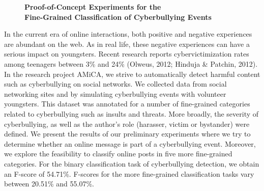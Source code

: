 \documentclass[10pt, a4paper, twopage, headinclude, footinclude, BCOR5mm]{scrartcl}
\begin{document}
\newpage

\begin{figure}[t!]
\centering
\large\textbf{Proof-of-Concept Experiments for the \\ Fine-Grained Classification of Cyberbullying Events}
\vspace*{0.5cm}
\end{figure}


        \begin{table}[t!]
    \end{table}

\noindent
In the current era of online interactions, both positive and negative experiences are abundant on the web. As in real life, these negative experiences can have a serious impact on youngsters. Recent research reports cybervictimization rates among teenagers between 3\% and 24\% (Olweus, 2012; Hinduja \& Patchin, 2012). In the research project AMiCA, we strive to automatically detect harmful content such as cyberbullying on social networks. We collected data from social networking sites and by simulating cyberbullying events with volunteer youngsters. This dataset was annotated for a number of fine-grained categories related to cyberbullying such as insults and threats. More broadly, the severity of cyberbullying, as well as the author's role (harasser, victim or bystander) were defined. We present the results of our preliminary experiments where we try to determine whether an online message is part of a cyberbullying event. Moreover, we explore the feasibility to classify online posts in five more fine-grained categories. For the binary classification task of cyberbullying detection, we obtain an F-score of 54.71\%. F-scores for the more fine-grained classification tasks vary between 20.51\% and 55.07\%.
\end{document}
